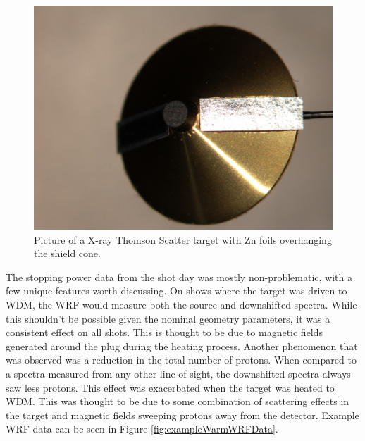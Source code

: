 \begin{figure}[!h]
    \centering
    \includegraphics[scale=0.7]{Figures/wdmOverhangFoil.pdf}
    \caption[Overhanging Zn Foil Design Flaw]{Picture of a X-ray Thomson Scatter target with Zn foils overhanging the shield cone.}
    \label{fig:wdmOverhangFoil}
\end{figure}

The stopping power data from the shot day was mostly non-problematic, with a few unique features worth discussing. On shows where the target was driven to WDM, the WRF would measure both the source and downshifted spectra. While this shouldn't be possible given the nominal geometry parameters, it was a consistent effect on all shots. This is thought to be due to magnetic fields generated around the plug during the heating process. Another phenomenon that was observed was a reduction in the total number of protons. When compared to a spectra measured from any other line of sight, the downshifted spectra always saw less protons. This effect was exacerbated when the target was heated to WDM. This was thought to be due to some combination of scattering effects in the target and magnetic fields sweeping protons away from the detector. Example WRF data can be seen in Figure \ref{fig:exampleWarmWRFData}.

